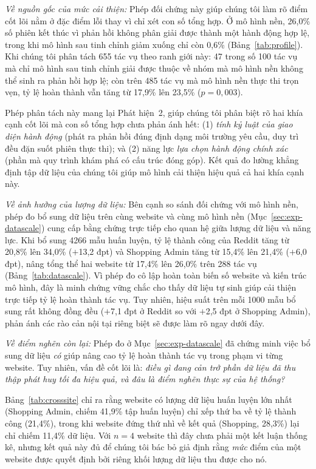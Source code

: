 \emph{Về nguồn gốc của mức cải thiện:} Phép đối chứng này giúp chúng tôi làm rõ điểm cốt lõi nằm ở đặc điểm lỗi thay vì chỉ xét con số tổng hợp. Ở mô hình nền, 26{,}0\% số phiên kết thúc vì phản hồi không phân giải được thành một hành động hợp lệ, trong khi mô hình sau tinh chỉnh giảm xuống chỉ còn 0{,}6\% (Bảng~\ref{tab:profile}). Khi chúng tôi phân tách 655 tác vụ theo ranh giới này: 47 trong số 100 tác vụ mà chỉ mô hình sau tinh chỉnh giải được thuộc về nhóm mà mô hình nền không thể sinh ra phản hồi hợp lệ; còn trên 485 tác vụ mà mô hình nền thực thi trọn vẹn, tỷ lệ hoàn thành vẫn tăng từ 17{,}9\% lên 23{,}5\% ($p = 0{,}003$).

Phép phân tách này mang lại Phát hiện~2, giúp chúng tôi phân biệt rõ hai khía cạnh cốt lõi mà con số tổng hợp chưa phản ánh hết: (1) \emph{tính kỷ luật của giao diện hành động} (phát ra phản hồi đúng định dạng môi trường yêu cầu, duy trì đều đặn suốt phiên thực thi); và (2) năng lực \emph{lựa chọn hành động chính xác} (phần mà quy trình khám phá có cấu trúc đóng góp). Kết quả đo lường khẳng định tập dữ liệu của chúng tôi giúp mô hình cải thiện hiệu quả cả hai khía cạnh này.

\emph{Về ảnh hưởng của lượng dữ liệu:} Bên cạnh so sánh đối chứng với mô hình nền, phép đo bổ sung dữ liệu trên cùng website và cùng mô hình nền (Mục~\ref{sec:exp-datascale}) cung cấp bằng chứng trực tiếp cho quan hệ giữa lượng dữ liệu và năng lực. Khi bổ sung 4266 mẫu huấn luyện, tỷ lệ thành công của Reddit tăng từ 20{,}8\% lên 34{,}0\% ($+$13{,}2 đpt) và Shopping Admin tăng từ 15{,}4\% lên 21{,}4\% ($+$6{,}0 đpt), nâng tổng thể hai website từ 17{,}4\% lên 26{,}0\% trên 288 tác vụ (Bảng~\ref{tab:datascale}). Vì phép đo cô lập hoàn toàn biến số website và kiến trúc mô hình, đây là minh chứng vững chắc cho thấy dữ liệu tự sinh giúp cải thiện trực tiếp tỷ lệ hoàn thành tác vụ. Tuy nhiên, hiệu suất trên mỗi 1000 mẫu bổ sung rất không đồng đều ($+$7{,}1 đpt ở Reddit so với $+$2{,}5 đpt ở Shopping Admin), phản ánh các rào cản nội tại riêng biệt sẽ được làm rõ ngay dưới đây.

\emph{Về điểm nghẽn còn lại:} Phép đo ở Mục~\ref{sec:exp-datascale} đã chứng minh việc bổ sung dữ liệu \emph{có} giúp nâng cao tỷ lệ hoàn thành tác vụ trong phạm vi từng website. Tuy nhiên, vấn đề cốt lõi là: \emph{điều gì đang cản trở phần dữ liệu đã thu thập phát huy tối đa hiệu quả, và đâu là điểm nghẽn thực sự của hệ thống?}

Bảng~\ref{tab:crosssite} chỉ ra rằng website có lượng dữ liệu huấn luyện lớn nhất (Shopping Admin, chiếm 41{,}9\% tập huấn luyện) chỉ xếp thứ ba về tỷ lệ thành công (21{,}4\%), trong khi website đứng thứ nhì về kết quả (Shopping, 28{,}3\%) lại chỉ chiếm 11{,}4\% dữ liệu. Với $n=4$ website thì đây chưa phải một kết luận thống kê, nhưng kết quả này đủ để chúng tôi bác bỏ giả định rằng \emph{mức} điểm của một website được quyết định bởi riêng khối lượng dữ liệu thu được cho nó.

